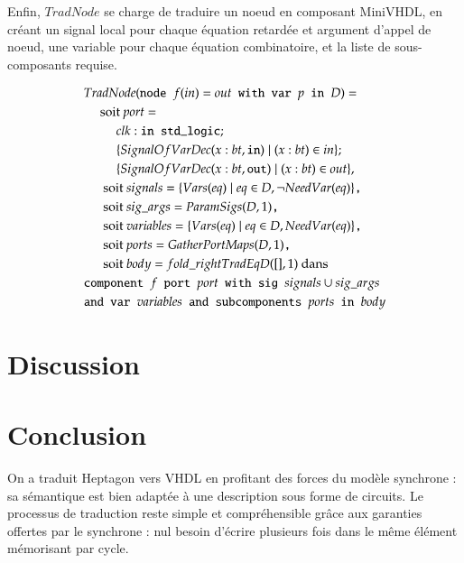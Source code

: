\documentclass[9pt,a4paper]{article}
\newcommand{\LANG}{Heptagon}
\newcommand{\p}[0]{\; \vert \;}
\newcommand{\mybox}[1]{\mbox{\tt{#1}}}
\newcommand{\bl}[0]{\hspace{0.45cm}}
\begin{document}
Enfin, $TradNode$ se charge de traduire un noeud en composant MiniVHDL, en
créant un signal local pour chaque équation retardée et argument d'appel de
noeud, une variable pour chaque équation combinatoire, et la liste de
sous-composants requise.

\begin{align*}
  & TradNode(\mybox{node } f(in) = out \mybox{ with var } p \mybox{ in } D) = \\
  & \bl \mbox{soit } port = \\
  & \bl \bl clk : \mybox{in std\_logic}; \\
  & \bl \bl \{ SignalOfVarDec(x : bt, \mybox{in}) \p (x : bt) \in in \}; \\
  & \bl \bl \{ SignalOfVarDec(x : bt, \mybox{out}) \p (x : bt) \in out \}, \\
  & \bl \mbox{ soit } signals = \{ \V{eq} \p eq \in D, \neg \NV{eq} \}
  \mybox{,} \\
  & \bl \mbox{ soit } sig\_args = \PS{D}{1} \mybox{,} \\
  & \bl \mbox{ soit } variables = \{ \V{eq} \p eq \in D, \NV{eq} \} \mybox{,} \\
  & \bl \mbox{ soit } ports = \GPM{D}{1} \mybox{,} \\
  & \bl \mbox{ soit } body = fold\_right TradEq D ([], 1) \mbox{ dans} \\
  & \mybox{component } f \mybox{ port } port \mybox{ with sig } signals \cup
  sig\_args \\
  & \mybox{and var } variables \mybox{ and subcomponents } ports \mybox{ in }
  body
\end{align*}

\section{Discussion}

\section{Conclusion}

On a traduit \LANG{} vers VHDL en profitant des forces du modèle synchrone : sa
sémantique est bien adaptée à une description sous forme de circuits. Le
processus de traduction reste simple et compréhensible grâce aux garanties
offertes par le synchrone : nul besoin d'écrire plusieurs fois dans le même
élément mémorisant par cycle.

\tableofcontents


\appendix
\end{document}
